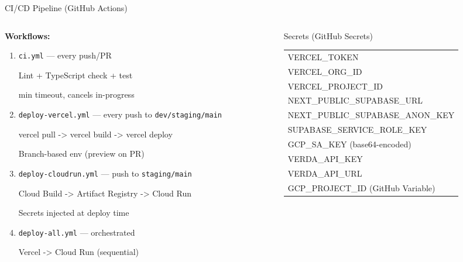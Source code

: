 \documentclass[10pt,aspectratio=169,t]{beamer}
\begin{document}
\begin{frame}{CI/CD Pipeline (GitHub Actions)}

  \begin{columns}

    \begin{column}{0.5\paperwidth}

      \textbf{Workflows:}

      \begin{enumerate}
        \item \texttt{ci.yml} --- every push/PR

          \quad Lint + TypeScript check + test

           min timeout, cancels in-progress

        \item \texttt{deploy-vercel.yml} --- every push to \texttt{dev/staging/main}

          \quad vercel pull -> vercel build -> vercel deploy

          \quad Branch-based env (preview on PR)

        \item \texttt{deploy-cloudrun.yml} --- push to \texttt{staging/main}

          \quad Cloud Build -> Artifact Registry -> Cloud Run

          \quad Secrets injected at deploy time

        \item \texttt{deploy-all.yml} --- orchestrated

          \quad Vercel -> Cloud Run (sequential)
      \end{enumerate}

    \end{column}

    \begin{column}{0.45\paperwidth}

      \begin{block}{Secrets (GitHub Secrets)}
        \ttfamily\scriptsize
        \begin{tabular}{l}
          VERCEL\_TOKEN\\
          VERCEL\_ORG\_ID\\
          VERCEL\_PROJECT\_ID\\
          NEXT\_PUBLIC\_SUPABASE\_URL\\
          NEXT\_PUBLIC\_SUPABASE\_ANON\_KEY\\
          SUPABASE\_SERVICE\_ROLE\_KEY\\
          GCP\_SA\_KEY (base64-encoded)\\
          VERDA\_API\_KEY\\
          VERDA\_API\_URL\\
          GCP\_PROJECT\_ID (GitHub Variable)
        \end{tabular}
      \end{block}


\end{column}
\end{columns}
\end{frame}
\end{document}
